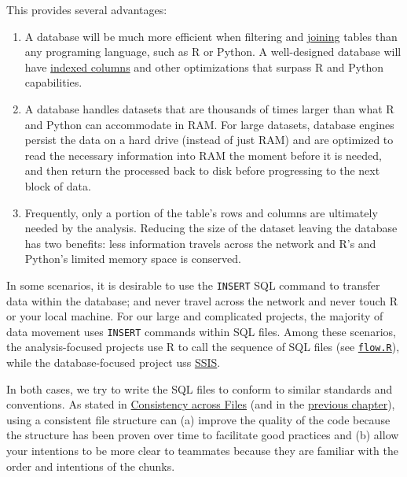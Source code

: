 \documentclass[
]{book}
\providecommand{\tightlist}{%
  \setlength{\itemsep}{0pt}\setlength{\parskip}{0pt}}
\begin{document}
This provides several advantages:

\begin{enumerate}
\def\labelenumi{\arabic{enumi}.}
\tightlist
\item
  A database will be much more efficient when filtering and \href{https://www.w3schools.com/sql/sql_join.asp}{joining} tables than any programing language, such as R or Python. A well-designed database will have \href{https://en.wikipedia.org/wiki/Database_index\#:~:text=A\%20database\%20index\%20is\%20a,maintain\%20the\%20index\%20data\%20structure.}{indexed columns} and other optimizations that surpass R and Python capabilities.
\item
  A database handles datasets that are thousands of times larger than what R and Python can accommodate in RAM. For large datasets, database engines persist the data on a hard drive (instead of just RAM) and are optimized to read the necessary information into RAM the moment before it is needed, and then return the processed back to disk before progressing to the next block of data.
\item
  Frequently, only a portion of the table's rows and columns are ultimately needed by the analysis. Reducing the size of the dataset leaving the database has two benefits: less information travels across the network and R's and Python's limited memory space is conserved.
\end{enumerate}

In some scenarios, it is desirable to use the \texttt{INSERT} SQL command to transfer data within the database; and never travel across the network and never touch R or your local machine. For our large and complicated projects, the majority of data movement uses \texttt{INSERT} commands within SQL files. Among these scenarios, the analysis-focused projects use R to call the sequence of SQL files (see \protect\hyperlink{repo-flow}{\texttt{flow.R}}), while the database-focused project uss \href{https://en.wikipedia.org/wiki/SQL_Server_Integration_Services}{SSIS}.

In both cases, we try to write the SQL files to conform to similar standards and conventions. As stated in \protect\hyperlink{consistency-files}{Consistency across Files} (and in the \protect\hyperlink{file-prototype-r}{previous chapter}), using a consistent file structure can (a) improve the quality of the code because the structure has been proven over time to facilitate good practices and (b) allow your intentions to be more clear to teammates because they are familiar with the order and intentions of the chunks.
\end{document}
